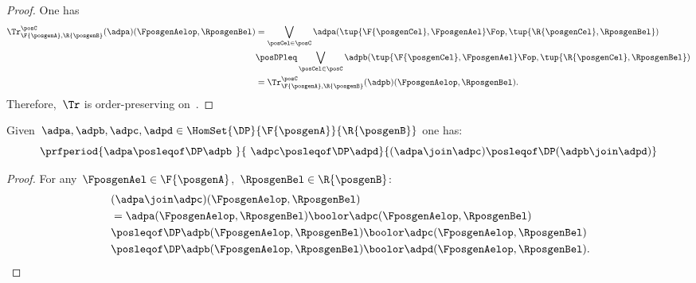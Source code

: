 \begin{proof}
    One has
    \begin{equation}
        \label{eq:trace_pres_ord}
        \begin{aligned}
            \Tr_{\F{\posgenA},\R{\posgenB}}^\posC(\adpa)(\FposgenAelop,\RposgenBel) & =
            \bigvee_{\posCel\in \posC}\adpa(\tup{\F{\posgenCel},\FposgenAel}\Fop,\tup{\R{\posgenCel},\RposgenBel})                                                                                     \\
                                                                                    & \posDPleq \bigvee_{\posCel\in \posC}\adpb(\tup{\F{\posgenCel},\FposgenAel}\Fop,\tup{\R{\posgenCel},\RposgenBel}) \\
                                                                                    & =\Tr_{\F{\posgenA},\R{\posgenB}}^\posC(\adpb)(\FposgenAelop,\RposgenBel).
        \end{aligned}
    \end{equation}
    Therefore,~$\Tr$ is order-preserving on~\DP.
\end{proof}

\begin{lemma}
    \label{lem:coprod_mon}
    Given~$\adpa,\adpb,\adpc,\adpd \in \HomSet{\DP}{\F{\posgenA}}{\R{\posgenB}}$ one has:
    \begin{equation*}
        \prfperiod{\adpa\posleqof\DP \adpb\ }{\ \adpc\posleqof\DP\adpd}{(\adpa\join\adpc)\posleqof\DP (\adpb\join \adpd)}
    \end{equation*}
\end{lemma}
\begin{proof}
    For any~$\FposgenAel\in \F{\posgenA}$,~$\RposgenBel\in \R{\posgenB}$:
    \begin{equation*}
        \begin{aligned}
            ~&(\adpa \join \adpc)(\FposgenAelop,\RposgenBel)\\
             & =\adpa(\FposgenAelop,\RposgenBel)\boolor \adpc(\FposgenAelop,\RposgenBel)              \\
             & \posleqof\DP \adpb(\FposgenAelop,\RposgenBel)\boolor \adpc(\FposgenAelop,\RposgenBel)  \\
             & \posleqof\DP \adpb(\FposgenAelop,\RposgenBel)\boolor \adpd(\FposgenAelop,\RposgenBel).
        \end{aligned}
    \end{equation*}
\end{proof}

